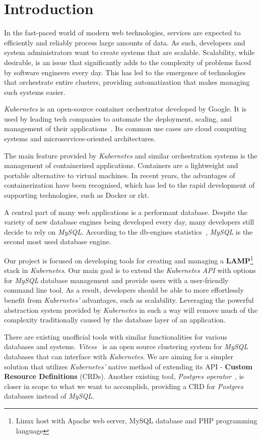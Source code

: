 \chapter{Introduction}
In the fast-paced world of modern web technologies, services are expected to efficiently and reliably process large amounts of data. As such, developers and system administrators want to create systems that are scalable. Scalability, while desirable, is an issue that significantly adds to the complexity of problems faced by software engineers every day. This has led to the emergence of technologies that orchestrate entire clusters, providing automatization that makes managing such systems easier.

\textit{Kubernetes} is an open-source container orchestrator developed by Google. It is used by leading tech companies to automate the deployment, scaling, and management of their applications~\cite{kube-usecase}. Its common use cases are cloud computing systems and microservices-oriented architectures.

The main feature provided by \textit{Kubernetes} and similar orchestration systems is the management of containerized applications. Containers are a lightweight and portable alternative to virtual machines. In recent years, the advantages of containerization have been recognised, which has led to the rapid development of supporting technologies, such as Docker or rkt.

A central part of many web applications is a performant database. Despite the variety of new database engines being developed every day, many developers still decide to rely on \textit{MySQL}. According to the db-engines statistics~\cite{db-eng}, \textit{MySQL} is the second most used database engine.

Our project is focused on developing tools for creating and managing a \textbf{LAMP}\footnote{Linux host with Apache web server, MySQL database and PHP programming language} stack in \textit{Kubernetes}. Our main goal is to extend the \textit{Kubernetes API} with options for \textit{MySQL} database management and provide users with a user-friendly command line tool. As a result, developers should be able to more effortlessly benefit from \textit{Kubernetes’} advantages, such as scalability. Leveraging the powerful abstraction system provided by \textit{Kubernetes} in such a way will remove much of the complexity traditionally caused by the database layer of an application.

There are existing unofficial tools with similar functionalities for various databases and systems. \textit{Vitess}~\cite{vitess} is an open source clustering system for \textit{MySQL} databases that can interface with \textit{Kubernetes}. We are aiming for a simpler solution that utilizes \textit{Kubernetes'} native method of extending its API - \textbf{Custom Resource Definitions} (CRDs). Another existing tool, \textit{Postgres operator}~\cite{psql-op}, is closer in scope to what we want to accomplish, providing a CRD for \textit{Postgres} databases instead of \textit{MySQL}.


